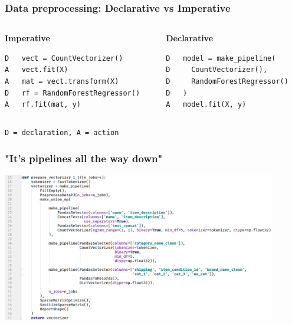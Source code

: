  \begin{frame}[fragile]
\frametitle{Data preprocessing: Declarative vs Imperative}

\begin{columns}
\begin{column}{0.5\textwidth}

\large \textbf{Imperative}

\begin{verbatim}
D   vect = CountVectorizer()
A   vect.fit(X)
A   mat = vect.transform(X)
D   rf = RandomForestRegressor()
A   rf.fit(mat, y)
\end{verbatim}

\end{column}
\begin{column}{0.5\textwidth}  %

\large \textbf{Declarative}

\begin{verbatim}
D   model = make_pipeline(
D     CountVectorizer(),
D     RandomForestRegressor()
D   )
A   model.fit(X, y)
\end{verbatim}
\end{column}
\end{columns}

\begin{verbatim}
D = declaration, A = action
\end{verbatim}

\end{frame}


\begin{frame}



\frametitle{"It's pipelines all the way down"}
\includegraphics[width=12cm]{img/pipelines-code.png}
\end{frame}


